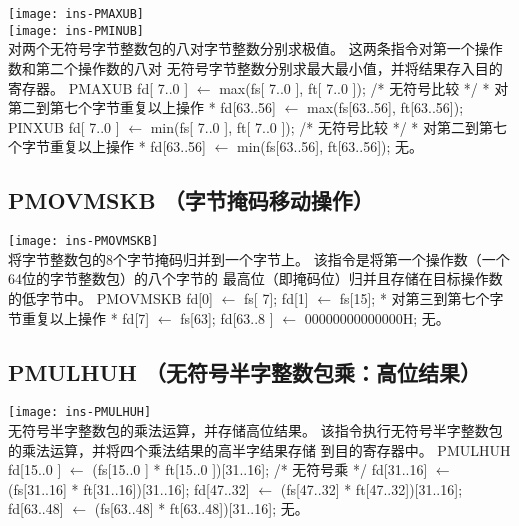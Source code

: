 \begin{instructionblk}
  \texttt{[image: ins-PMAXUB]} \\
  \texttt{[image: ins-PMINUB]} \\
  {对两个无符号字节整数包的八对字节整数分别求极值。}
  {这两条指令对第一个操作数和第二个操作数的八对
  无符号字节整数分别求最大最小值，并将结果存入目的寄存器。}
  {PMAXUB \narrownewline
  fd[ 7..0 ] $\leftarrow$ max(fs[ 7..0 ], ft[ 7..0 ]); /* 无符号比较 */ \narrownewline
  * 对第二到第七个字节重复以上操作 * \narrownewline
  fd[63..56] $\leftarrow$ max(fs[63..56], ft[63..56]); \narrownewline \narrownewline
  PINXUB \narrownewline
  fd[ 7..0 ] $\leftarrow$ min(fs[ 7..0 ], ft[ 7..0 ]); /* 无符号比较 */ \narrownewline
  * 对第二到第七个字节重复以上操作 * \narrownewline
  fd[63..56] $\leftarrow$ min(fs[63..56], ft[63..56]);}
  {无。}
\end{instructionblk}

\subsection{PMOVMSKB （字节掩码移动操作）}

\begin{instructionblk}
  \texttt{[image: ins-PMOVMSKB]} \\
  {将字节整数包的8个字节掩码归并到一个字节上。}
  {该指令是将第一个操作数（一个64位的字节整数包）的八个字节的
  最高位（即掩码位）归并且存储在目标操作数的低字节中。}
  {PMOVMSKB \narrownewline
  fd[0] $\leftarrow$ fs[ 7]; \narrownewline
  fd[1] $\leftarrow$ fs[15]; \narrownewline
  * 对第三到第七个字节重复以上操作 * \narrownewline
  fd[7] $\leftarrow$ fs[63]; \narrownewline
  fd[63..8 ] $\leftarrow$ 00000000000000H;}
  {无。}
\end{instructionblk}

\subsection{PMULHUH （无符号半字整数包乘：高位结果）}

\begin{instructionblk}
  \texttt{[image: ins-PMULHUH]} \\
  {无符号半字整数包的乘法运算，并存储高位结果。}
  {该指令执行无符号半字整数包的乘法运算，并将四个乘法结果的高半字结果存储
  到目的寄存器中。}
  {PMULHUH \narrownewline
  fd[15..0 ] $\leftarrow$ (fs[15..0 ] * ft[15..0 ])[31..16]; /* 无符号乘 */ \narrownewline
  fd[31..16] $\leftarrow$ (fs[31..16] * ft[31..16])[31..16]; \narrownewline
  fd[47..32] $\leftarrow$ (fs[47..32] * ft[47..32])[31..16]; \narrownewline
  fd[63..48] $\leftarrow$ (fs[63..48] * ft[63..48])[31..16];}
  {无。}
\end{instructionblk}

